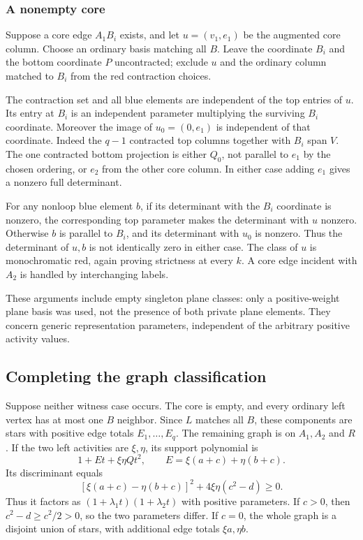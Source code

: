 \documentclass[11pt,a4paper]{article}
\theoremstyle{remark}\newtheorem{remark}[theorem]{Remark}
\begin{document}
\subsubsection{A nonempty core}
Suppose a core edge $A_1B_i$ exists, and let $u=(v_1,e_1)$ be the augmented core column. Choose an ordinary basis matching all $B$. Leave the coordinate $B_i$ and the bottom coordinate $P$ uncontracted; exclude $u$ and the ordinary column matched to $B_i$ from the red contraction choices.

The contraction set and all blue elements are independent of the top entries of $u$. Its entry at $B_i$ is an independent parameter multiplying the surviving $B_i$ coordinate. Moreover the image of $u_0=(0,e_1)$ is independent of that coordinate. Indeed the $q-1$ contracted top columns together with $B_i$ span $V$. The one contracted bottom projection is either $Q_0$, not parallel to $e_1$ by the chosen ordering, or $e_2$ from the other core column. In either case adding $e_1$ gives a nonzero full determinant.

For any nonloop blue element $b$, if its determinant with the $B_i$ coordinate is nonzero, the corresponding top parameter makes the determinant with $u$ nonzero. Otherwise $b$ is parallel to $B_i$, and its determinant with $u_0$ is nonzero. Thus the determinant of $u,b$ is not identically zero in either case. The class of $u$ is monochromatic red, again proving strictness at every $k$. A core edge incident with $A_2$ is handled by interchanging labels.

These arguments include empty singleton plane classes: only a positive-weight plane basis was used, not the presence of both private plane elements. They concern generic representation parameters, independent of the arbitrary positive activity values.

\subsection{Completing the graph classification}
Suppose neither witness case occurs. The core is empty, and every ordinary left vertex has at most one $B$ neighbor. Since $L$ matches all $B$, these components are stars with positive edge totals $E_1,\ldots,E_q$. The remaining graph is on $A_1,A_2$ and $R$. If the two left activities are $\xi,\eta$, its support polynomial is
\[
 1+E t+\xi\eta Q t^2,\qquad
 E=\xi(a+c)+\eta(b+c).
\]
Its discriminant equals
\begin{equation}\label{mrn:w:se:eq:discriminant}
 [\xi(a+c)-\eta(b+c)]^2+4\xi\eta(c^2-d)\ge0.
\end{equation}
Thus it factors as $(1+\lambda_1t)(1+\lambda_2t)$ with positive parameters. If $c>0$, then $c^2-d\ge c^2/2>0$, so the two parameters differ. If $c=0$, the whole graph is a disjoint union of stars, with additional edge totals $\xi a,\eta b$.
\end{document}
